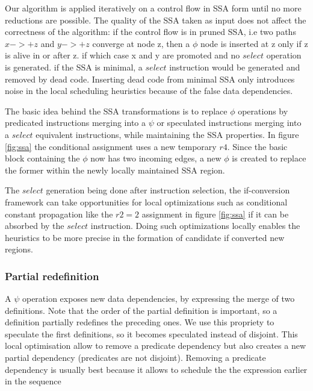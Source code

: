 Our algorithm is applied iteratively on a control flow in SSA form until no more reductions are possible. The quality of the SSA taken as input does not affect the correctness of the algorithm: if the control flow is in pruned SSA, i.e two paths $x->+z$ and $y->+z$ converge at node z, then a $\phi$ node is inserted at z only if z is alive in or after z. if which case x and y are promoted and no $select$ operation is generated. if the SSA is minimal, a $select$ instruction would be generated and removed by dead code. Inserting dead code from minimal SSA only introduces noise in the local scheduling heuristics because of the false data dependencies.

The basic idea behind the SSA transformations is to replace $\phi$ operations by predicated instructions merging into a $\psi$ or speculated instructions merging into a $select$ equivalent instructions, while maintaining the SSA properties. In figure \ref{fig:ssa} the conditional assignment uses a new temporary $r4$. Since the basic block containing the $\phi$ now has two incoming edges, a new $\phi$ is created to replace the former within the newly locally maintained SSA region.

The $select$ generation being done after instruction selection, the if-conversion framework can take opportunities for local optimizations such as conditional constant propagation like the $r2=2$ assignment in figure \ref{fig:ssa} if it can be absorbed by the $select$ instruction. Doing such optimizations locally enables the heuristics to be more precise in the formation of candidate if converted new regions.

\subsubsection{Partial redefinition}

A $\psi$ operation exposes new data dependencies, by expressing the merge of two definitions. Note that the order of the partial definition is important, so a definition partially redefines the preceding ones. We use this propriety to speculate the first definitions, so it becomes speculated instead of disjoint. This local optimisation allow to remove a predicate dependency but also creates a new partial dependency (predicates are not disjoint). Removing a predicate dependency is usually best because it allows to schedule the the expression earlier in the sequence

